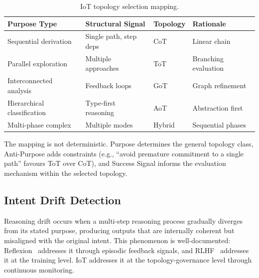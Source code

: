 \documentclass[11pt,a4paper]{article}
\begin{document}
\begin{table}[htbp]
\centering
\caption{IoT topology selection mapping.}
\label{tab:mapping}
\small
\begin{tabularx}{\textwidth}{@{}llll@{}}
\toprule
\textbf{Purpose Type} & \textbf{Structural Signal} & \textbf{Topology} & \textbf{Rationale} \\
\midrule
Sequential derivation & Single path, step deps & CoT & Linear chain \\
Parallel exploration & Multiple approaches & ToT & Branching evaluation \\
Interconnected analysis & Feedback loops & GoT & Graph refinement \\
Hierarchical classification & Type-first reasoning & AoT & Abstraction first \\
Multi-phase complex & Multiple modes & Hybrid & Sequential phases \\
\bottomrule
\end{tabularx}
\end{table}

The mapping is not deterministic. Purpose determines the general topology class, Anti-Purpose adds constraints (e.g., ``avoid premature commitment to a single path'' favours ToT over CoT), and Success Signal informs the evaluation mechanism within the selected topology.

\subsection{Intent Drift Detection}

Reasoning drift occurs when a multi-step reasoning process gradually diverges from its stated purpose, producing outputs that are internally coherent but misaligned with the original intent. This phenomenon is well-documented: Reflexion~\citep{shinn2023reflexion} addresses it through episodic feedback signals, and RLHF~\citep{ouyang2022instructgpt} addresses it at the training level. IoT addresses it at the topology-governance level through continuous monitoring.
\end{document}
